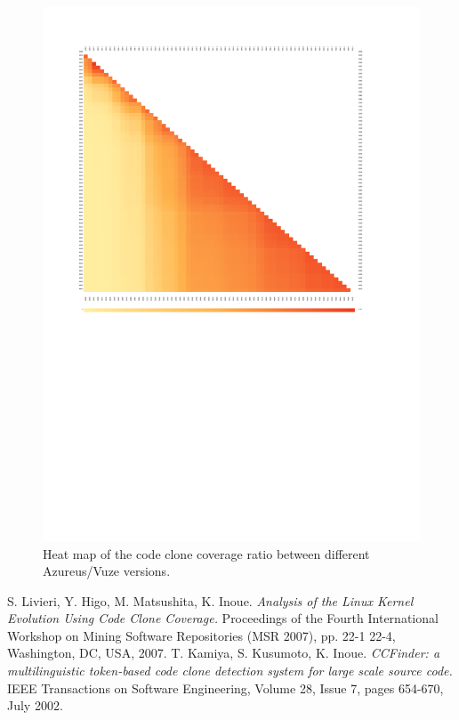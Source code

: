 \documentclass[a4paper,twoside, twocolumn, 11pt]{article}
\numberwithin{equation}{section}
\begin{document}
\begin{figure}
\center
\includegraphics[width=\textwidth]{first66min-max.pdf}
\caption{Heat map of the code clone coverage ratio between different Azureus/Vuze versions.}
\label{fig:min-max}
\end{figure}

\begin{thebibliography}{9}
S. Livieri, Y. Higo, M. Matsushita, K. Inoue. \emph{Analysis of the Linux Kernel Evolution Using Code Clone Coverage.} Proceedings of the Fourth International Workshop on Mining Software Repositories (MSR 2007),  pp. 22-1 22-4, Washington, DC, USA, 2007.
T. Kamiya, S. Kusumoto, K. Inoue. \emph{CCFinder: a multilinguistic token-based code clone detection system for large scale source code.} IEEE Transactions on Software Engineering, Volume 28, Issue 7, pages 654-670, July 2002.
\end{thebibliography}
\end{document}
